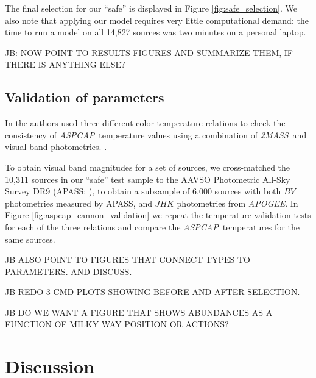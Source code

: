 \documentclass[modern]{aastex62}
\newcommand{\apogee}{\textsl{APOGEE}}
\newcommand{\aspcap}{\textsl{ASPCAP}}
\newcommand{\zmass}{\textsl{2MASS}}
\begin{document}
The final selection for our ``safe'' is displayed in Figure \ref{fig:safe_selection}. We also note that applying our model requires very little computational demand: the time to run a model on all 14,827 sources was two minutes on a personal laptop.

JB: NOW POINT TO RESULTS FIGURES AND SUMMARIZE THEM, IF THERE IS ANYTHING ELSE?

\subsection{Validation of parameters}

In \citealt{Schmidt:2016} the authors used three different color-temperature relations to check the consistency of \aspcap\ temperature values using a combination of \zmass\ and visual band photometries. \color{black}. 

To obtain visual band magnitudes for a set of sources, we cross-matched the 10,311 sources in our ``safe'' test sample to the AAVSO Photometric All-Sky Survey DR9 (APASS; \citealt{Henden:2016}), to obtain a subsample of 6,000 sources with both $BV$ photometries measured by APASS, and $JHK$ photometries from \apogee. In Figure \ref{fig:aspcap_cannon_validation} we repeat the temperature validation tests for each of the three relations and compare the \aspcap\ temperatures for the same sources. \color{gcolor}{Comments about validation results and the uncertainty of our Cannon temperatures...}\color{black}

\color{gcolor}{What are all of the parameters we want to report and what do we want to emphasize? Are there other parameters (such as mass) that might be straightforward to estimate?}\color{black}

JB ALSO POINT TO FIGURES THAT CONNECT TYPES TO PARAMETERS. AND DISCUSS.

JB REDO 3 CMD PLOTS SHOWING BEFORE AND AFTER SELECTION.

JB DO WE WANT A FIGURE THAT SHOWS ABUNDANCES AS A FUNCTION OF MILKY WAY POSITION OR ACTIONS?

\section{Discussion} \label{sec:discussion}
\end{document}
